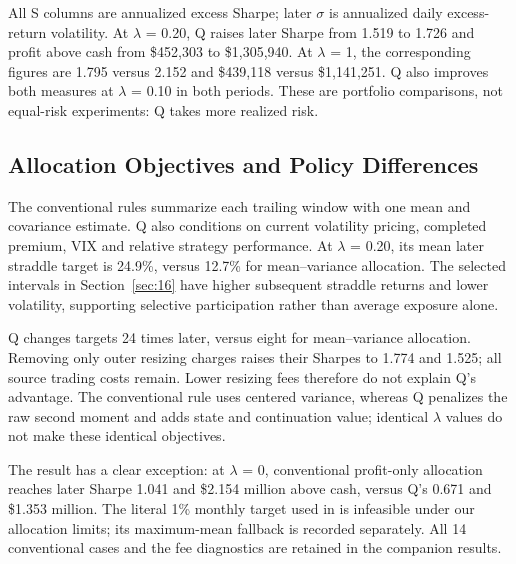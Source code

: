 All S columns are annualized excess Sharpe; later \(\sigma\) is annualized daily excess-return volatility. At \(\lambda\) = 0.20, Q raises later Sharpe from 1.519 to 1.726 and profit above cash from \$452,303 to \$1,305,940. At \(\lambda\) = 1, the corresponding figures are 1.795 versus 2.152 and \$439,118 versus \$1,141,251. Q also improves both measures at \(\lambda\) = 0.10 in both periods. These are portfolio comparisons, not equal-risk experiments: Q takes more realized risk.


\subsection*{Allocation Objectives and Policy Differences}

The conventional rules summarize each trailing window with one mean and covariance estimate. Q also conditions on current volatility pricing, completed premium, VIX and relative strategy performance. At \(\lambda\) = 0.20, its mean later straddle target is 24.9\%, versus 12.7\% for mean--variance allocation. The selected intervals in Section~\ref{sec:16} have higher subsequent straddle returns and lower volatility, supporting selective participation rather than average exposure alone.


Q changes targets 24 times later, versus eight for mean--variance allocation. Removing only outer resizing charges raises their Sharpes to 1.774 and 1.525; all source trading costs remain. Lower resizing fees therefore do not explain Q's advantage. The conventional rule uses centered variance, whereas Q penalizes the raw second moment and adds state and continuation value; identical \(\lambda\) values do not make these identical objectives.


The result has a clear exception: at \(\lambda\) = 0, conventional profit-only allocation reaches later Sharpe 1.041 and \$2.154 million above cash, versus Q's 0.671 and \$1.353 million. The literal 1\% monthly target used in \cite{caner2026} is infeasible under our allocation limits; its maximum-mean fallback is recorded separately. All 14 conventional cases and the fee diagnostics are retained in the companion results.
